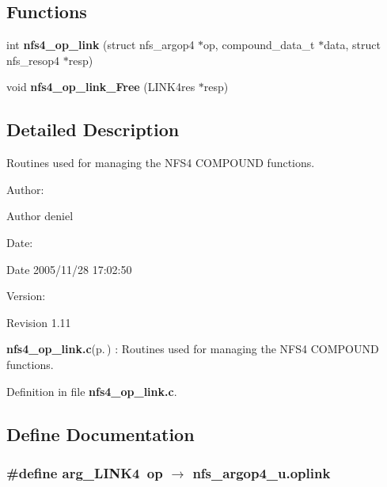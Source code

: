 \subsection*{Functions}
\begin{CompactItemize}
\item 
int {\bf nfs4\_\-op\_\-link} (struct nfs\_\-argop4 $\ast$op, compound\_\-data\_\-t $\ast$data, struct nfs\_\-resop4 $\ast$resp)
\item 
void {\bf nfs4\_\-op\_\-link\_\-Free} (LINK4res $\ast$resp)
\end{CompactItemize}


\subsection{Detailed Description}
Routines used for managing the NFS4 COMPOUND functions. 

\begin{Desc}
\item[Author:]\begin{Desc}
\item[Author]deniel \end{Desc}
\end{Desc}
\begin{Desc}
\item[Date:]\begin{Desc}
\item[Date]2005/11/28 17:02:50 \end{Desc}
\end{Desc}
\begin{Desc}
\item[Version:]\begin{Desc}
\item[Revision]1.11 \end{Desc}
\end{Desc}
{\bf nfs4\_\-op\_\-link.c}{\rm (p.\,\pageref{nfs4__op__link_8c})} : Routines used for managing the NFS4 COMPOUND functions.

Definition in file {\bf nfs4\_\-op\_\-link.c}.

\subsection{Define Documentation}
\subsubsection{\setlength{\rightskip}{0pt plus 5cm}\#define arg\_\-LINK4\ op $\rightarrow$ nfs\_\-argop4\_\-u.oplink}\label{nfs4__op__link_8c_a0}


